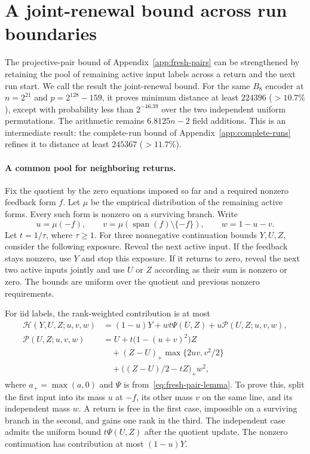 \section{A joint-renewal bound across run boundaries}\label{app:joint-renewal}

The projective-pair bound of Appendix~\ref{app:fresh-pairs} can be
strengthened by retaining the pool of remaining active input labels
across a return and the next run start. We call the result the
joint-renewal bound. For the same $B_8$ encoder at $n=2^{21}$ and
$p=2^{128}-159$, it proves minimum distance at least $224396$
($>10.7\%$), except with probability less than $2^{-46.39}$ over the
two independent uniform permutations. The arithmetic remains
$6.8125n-2$ field additions. This is an intermediate result: the
complete-run bound of Appendix~\ref{app:complete-runs} refines it to
distance at least $245367$ ($>11.7\%$).

\paragraph{A common pool for neighboring returns.}
Fix the quotient by the zero equations imposed so far and a required
nonzero feedback form $f$. Let $\mu$ be the empirical distribution of
the remaining active forms. Every such form is nonzero on a surviving
branch. Write
\[
 u=\mu(-f),\qquad
 v=\mu(\operatorname{span}(f)\setminus\{-f\}),\qquad w=1-u-v.
\]
Let $t=1/\tau$, where $\tau\ge1$. For three nonnegative continuation
bounds $Y,U,Z$, consider the following exposure. Reveal the next active
input. If the feedback stays nonzero, use $Y$ and stop this exposure.
If it returns to zero, reveal the next two active inputs jointly and
use $U$ or $Z$ according as their sum is nonzero or zero. The bounds are
uniform over the quotient and previous nonzero requirements.

For iid labels, the rank-weighted contribution is at most
\begin{align*}
 \mathcal H(Y,U,Z;u,v,w)
  &=(1-u)Y+wt\Psi(U,Z)+u\mathcal P(U,Z;u,v,w),\\
 \mathcal P(U,Z;u,v,w)
  &=U+t\bigl(1-(u+v)^2\bigr)Z\\
  &\quad +(Z-U)_+\max\{2uv,v^2/2\}\\
  &\quad +\bigl((Z-U)/2-tZ\bigr)_+w^2,
\end{align*}
where $a_+=\max(a,0)$ and $\Psi$ is from~\eqref{eq:fresh-pair-lemma}.
To prove this, split the first input into its mass $u$ at $-f$, its other
mass $v$ on the same line, and its independent mass $w$. A return is free
in the first case, impossible on a surviving branch in the second, and
gains one rank in the third. The independent case admits the uniform
bound $t\Psi(U,Z)$ after the quotient update. The nonzero continuation
has contribution at most $(1-u)Y$.

